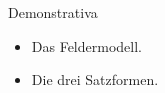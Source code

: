 \begin{syntax}{Demonstrativa}{}
\begin{itemize}
	\item Das Feldermodell. \\
	\item Die drei Satzformen. \\
\end{itemize}
\end{syntax}
